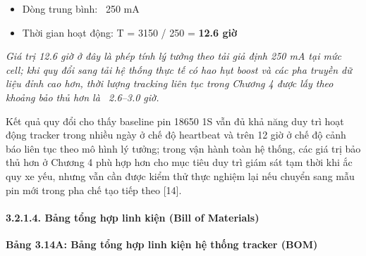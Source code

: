 \documentclass[13pt,a4paper]{extarticle}
\renewcommand{\\}{\thesislongtableorignewline\hline}%
\newcommand{\thesistabletitle}[1]{%
  \begin{center}\textbf{#1}\end{center}%
}
\providecommand{\tightlist}{%
  \setlength{\itemsep}{0pt}\setlength{\parskip}{0pt}}
\begin{document}
\begin{itemize}
\tightlist
\item
  Dòng trung bình: ~250 mA
\item
  Thời gian hoạt động: T = 3150 / 250 = \textbf{12.6 giờ}
\end{itemize}

\emph{Giá trị 12.6 giờ ở đây là phép tính lý tưởng theo tải giả định 250
mA tại mức cell; khi quy đổi sang tải hệ thống thực tế có hao hụt boost
và các pha truyền dữ liệu đỉnh cao hơn, thời lượng tracking liên tục
trong Chương 4 được lấy theo khoảng bảo thủ hơn là
~2.6--3.0 giờ.}

Kết quả quy đổi cho thấy baseline pin 18650 1S vẫn đủ khả năng duy trì
hoạt động tracker trong nhiều ngày ở chế độ heartbeat và trên 12 giờ ở
chế độ cảnh báo liên tục theo mô hình lý tưởng; trong vận hành toàn hệ
thống, các giá trị bảo thủ hơn ở Chương 4 phù hợp hơn cho mục tiêu duy
trì giám sát tạm thời khi ắc quy xe yếu, nhưng vẫn cần được kiểm thử
thực nghiệm lại nếu chuyển sang mẫu pin mới trong pha chế tạo tiếp theo
{[}14{]}.

\paragraph{3.2.1.4. Bảng tổng hợp linh kiện (Bill of
Materials)}\label{3214-bux1ea3ng-tux1ed5ng-hux1ee3p-linh-kiux1ec7n-bill-of-materials}

\thesistabletitle{Bảng 3.14A: Bảng tổng hợp linh kiện hệ thống tracker (BOM)}
\end{document}
